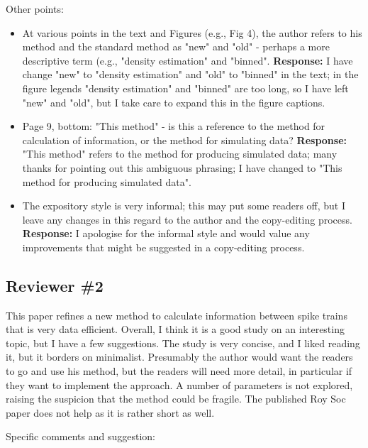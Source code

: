 \documentclass[12pt]{article}
\begin{document}
Other points:

\begin{itemize}
\item At various points in the text and Figures (e.g., Fig 4), the author
refers to his method and the standard method as "new" and "old" -
perhaps a more descriptive term (e.g., "density estimation" and
"binned". \textbf{Response:} I have change "new" to "density estimation" and "old" to "binned"
   in the text; in the figure legends "density estimation" and
   "binned" are too long, so I have left "new" and "old", but I take
   care to expand this in the figure captions.
\item Page 9, bottom: "This method" - is this a reference to the method for
calculation of information, or the method for simulating data? \textbf{Response:} "This method" refers to the method for producing simulated data;
   many thanks for pointing out this ambiguous phrasing; I have
   changed to "This method for producing simulated data".
\item The expository style is very informal; this may put some readers off,
but I leave any changes in this regard to the author and the
copy-editing process. \textbf{Response:} I apologise for the informal style and would value any improvements that might be suggested in a copy-editing process.

\end{itemize}

\subsection*{Reviewer \#2}

This paper refines a new method to calculate information between spike
trains that is very data efficient.  Overall, I think it is a good
study on an interesting topic, but I have a few suggestions.  The
study is very concise, and I liked reading it, but it borders on
minimalist. Presumably the author would want the readers to go and use
his method, but the readers will need more detail, in particular if
they want to implement the approach. A number of parameters is not
explored, raising the suspicion that the method could be fragile.  The
published Roy Soc paper does not help as it is rather short as well.

Specific comments and suggestion:
\end{document}
